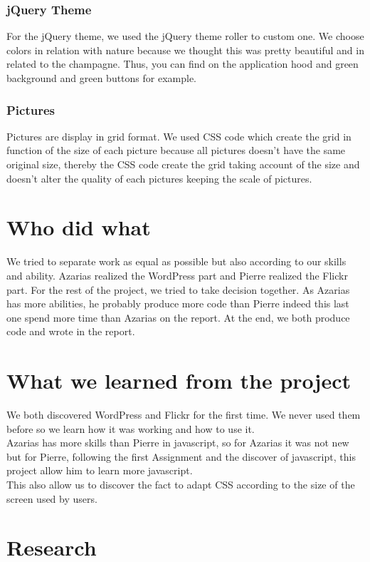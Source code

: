 \documentclass[12pt]{report}%
\begin{document}
\subsection{jQuery Theme}
For the jQuery theme, we used the jQuery theme roller to custom one. We choose colors in relation with nature because we thought this was pretty beautiful and in related to the champagne. Thus, you can find on the application hood and green background and green buttons for example.
\subsection{Pictures}
Pictures are display in grid format. We used CSS code which create the grid in function of the size of each picture because all pictures doesn't have the same original size, thereby the CSS code create the grid taking account of the size and doesn't alter the quality of each pictures keeping the scale of pictures.

\chapter{Who did what}
We tried to separate work as equal as possible but also according to our skills and ability. Azarias realized the WordPress part and Pierre realized the Flickr part. For the rest of the project, we tried to take decision together. As Azarias has more abilities, he probably produce more code than Pierre indeed this last one spend more time than Azarias on the report. At the end, we both produce code and wrote in the report. 

\chapter{What we learned from the project}
We both discovered WordPress and Flickr for the first time. We never used them before so we learn how it was working and how to use it.\\
Azarias has more skills than Pierre in javascript, so for Azarias it was not new but for Pierre, following the first Assignment and the discover of javascript, this project allow him to learn more javascript.\\
This also allow us to discover the fact to adapt CSS according to the size of the screen used by users. 

\chapter{Research}
\end{document}

